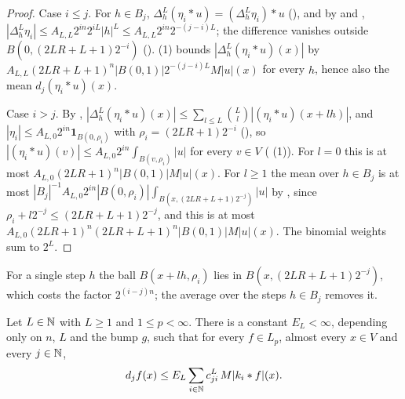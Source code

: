 \begin{proof}
\leanok
Case $i \leq j$. For $h \in B_j$, $\Delta^L_h (\eta_i * u) = (\Delta^L_h \eta_i) * u$
(), and by  and
,
$|\Delta^L_h \eta_i| \leq A_{L,L} 2^{in} 2^{iL} |h|^L \leq A_{L,L} 2^{in} 2^{-(j-i)L}$;
the difference vanishes outside $B(0, (2LR + L + 1) 2^{-i})$
().  (1) bounds
$|\Delta^L_h (\eta_i * u)(x)|$ by $A_{L,L} (2LR + L + 1)^n |B(0,1)| 2^{-(j-i)L} M|u|(x)$ for
every $h$, hence also the mean $d_j(\eta_i * u)(x)$.

Case $i > j$. By ,
$|\Delta^L_h (\eta_i * u)(x)| \leq \sum_{l \leq L} \binom{L}{l} |(\eta_i * u)(x + l h)|$, and
$|\eta_i| \leq A_{L,0} 2^{in} \mathbf 1_{B(0, \rho_i)}$ with $\rho_i = (2LR + 1) 2^{-i}$
(), so
$|(\eta_i * u)(v)| \leq A_{L,0} 2^{in} \int_{B(v, \rho_i)} |u|$ for every $v \in V$
( (1)). For $l = 0$ this is at most
$A_{L,0} (2LR + 1)^n |B(0,1)| M|u|(x)$. For $l \geq 1$ the mean over $h \in B_j$ is at most
$|B_j|^{-1} A_{L,0} 2^{in} |B(0, \rho_i)| \int_{B(x, (2LR + L + 1) 2^{-j})} |u|$ by
, since $\rho_i + l 2^{-j} \leq (2LR + L + 1) 2^{-j}$, and this is at most
$A_{L,0} (2LR + 1)^n (2LR + L + 1)^n |B(0,1)| M|u|(x)$. The binomial weights sum to $2^L$.
\end{proof}

For a single step $h$ the ball $B(x + l h, \rho_i)$ lies in $B(x, (2LR + L + 1) 2^{-j})$, which
costs the factor $2^{(i-j)n}$; the average over the steps $h \in B_j$ removes it.

\begin{theorem}
\label{thm:ball-means-by-local-means}
\leanok
{}
Let $L \in \mathbb{N}$ with $L \geq 1$ and $1 \leq p < \infty$. There is a constant $E_L < \infty$,
depending only on $n$, $L$ and the bump $g$, such that for every $f \in L_p$, almost every
$x \in V$ and every $j \in \mathbb{N}$,
\[
  d_j f(x) \leq E_L \sum_{i \in \mathbb{N}} c^L_{ji} \, M|k_i * f|(x) .
\]
\end{theorem}

